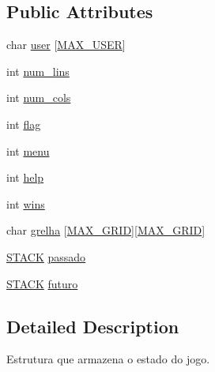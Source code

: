 \subsection*{Public Attributes}
\begin{DoxyCompactItemize}
\item 
char \hyperlink{structestado_a256854b71f528cf0aafb9acb84fac759}{user} \mbox{[}\hyperlink{estado_8h_aa87360d2dd1fd5a07f92c6afe93045fc}{M\+A\+X\+\_\+\+U\+S\+E\+R}\mbox{]}
\item 
int \hyperlink{structestado_ab02e4fe5644c3b59088d7c4566d70105}{num\+\_\+lins}
\item 
int \hyperlink{structestado_a5b68d5d6aae41b5b7dd9308e40d53506}{num\+\_\+cols}
\item 
int \hyperlink{structestado_a6786d825e542118c5d79b852ace947f7}{flag}
\item 
int \hyperlink{structestado_a219ca4fd4c068f749afedb392e3f83b0}{menu}
\item 
int \hyperlink{structestado_a488c0d087dcc7e84034cdd814cf3bf3b}{help}
\item 
int \hyperlink{structestado_a87d1b6f5a4c37f8d9348c30bbf1f67cc}{wins}
\item 
char \hyperlink{structestado_a7d72f243f07d0d277f24e15e28a9a7b2}{grelha} \mbox{[}\hyperlink{estado_8h_ab02e1c5c6948bf8cf3c21a0acad8a578}{M\+A\+X\+\_\+\+G\+R\+I\+D}\mbox{]}\mbox{[}\hyperlink{estado_8h_ab02e1c5c6948bf8cf3c21a0acad8a578}{M\+A\+X\+\_\+\+G\+R\+I\+D}\mbox{]}
\item 
\hyperlink{stack_8c_a4b4ce005aaf46d538cc28d07482e137e}{S\+T\+A\+C\+K} \hyperlink{structestado_ada4a7610a6125feea84f1eeb0ae4fd1a}{passado}
\item 
\hyperlink{stack_8c_a4b4ce005aaf46d538cc28d07482e137e}{S\+T\+A\+C\+K} \hyperlink{structestado_af5d593ebecd3046a3df69b1ddec6942f}{futuro}
\end{DoxyCompactItemize}


\subsection{Detailed Description}
Estrutura que armazena o estado do jogo. 

